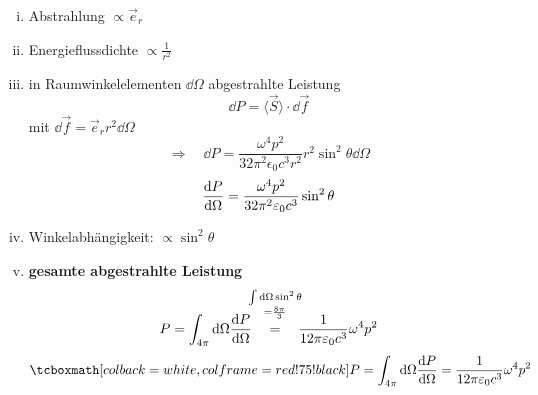 \begin{enumerate}[i)]
	\item Abstrahlung $ \propto \vec{e}_r $
	\item Energieflussdichte $ \propto \frac{1}{r^2} $
	\item in Raumwinkelelementen $ \dd \Omega $ abgestrahlte Leistung
	\begin{equation*}
	\dd P = \langle \vec{S} \rangle \cdot \dd \vec{f}
	\end{equation*}
 	mit $ \dd \vec{f} = \vec{e}_r r^2 \dd \Omega $
	\begin{equation*}
	\Rightarrow \quad \dd P = \frac{\omega^4 p^2}{32 \pi^2 \epsilon_0 c^3 r^2} r^2 \sin^2 \theta \dd \Omega
	\end{equation*}
	\begin{equation*}
	\frac{\textrm{d} P}{\textrm{d} \Omega} = \frac{\omega^4 p^2}{32 \pi^2 \varepsilon_0 c^3} \sin^2 \theta
	\end{equation*}
	\item Winkelabhängigkeit: $ \propto \sin^2 \theta $
	\item \textbf{gesamte abgestrahlte Leistung}
	\begin{align*}
	P = \int_{4\pi} \dd \Omega \frac{\dd P}{\dd \Omega} \quad \overset{\mathclap{\substack{ \int \dd \Omega \sin^2 \theta \\ = \frac{8 \pi}{3} \\ \phantom{0} }}}{=} \quad \frac{1}{12 \pi \epsilon_0 c^3} \omega	^4 p^2
	\end{align*}
	\begin{equation*}
	\rmbox{P = \int_{4\pi} \dd \Omega \frac{\dd P}{\dd \Omega} = \frac{1}{12 \pi \epsilon_0 c^3} \omega^4 p^2}
	\end{equation*}
\end{enumerate}
\vspace{20pt}
